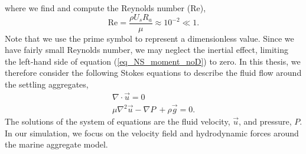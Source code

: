 where we find and compute the Reynolds number (Re),
\begin{equation}
	\text{Re} = \frac{\rho U_s R_a}{\mu} \approx 10^{-2}
	\ll 1.
\end{equation}
Note that we use the prime symbol to represent a dimensionless value.
Since we have fairly small Reynolds number, we may neglect the inertial effect, limiting the left-hand side of equation (\ref{eq_NS_moment_noD}) to zero.
In this thesis, we therefore consider the following Stokes equations to describe the fluid flow around the settling aggregates,
 \begin{align}
	\nabla \cdot \vec{u}  = 0  
	\nonumber \\
	\mu \nabla^2 \vec{u}    - \nabla P\ + \rho  \vec{g} = 0.
	\label{eq_stokes2}
\end{align}
The solutions of the system of equations are the fluid velocity, $\vec{u}$, and pressure, $P$. In our simulation, we focus on the velocity field and hydrodynamic forces around the marine aggregate model. 
%
%
%
